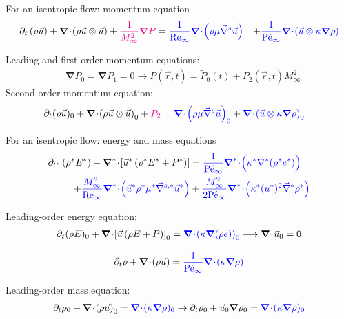 \documentclass[xcolor=dvipsnames,10pt]{beamer}
\renewcommand{\Re}{\textrm{Re}}
\newcommand{\Pe}{\textrm{P\'e}}
\renewcommand{\div}{\boldsymbol{\nabla}\! \cdot \!}
\newcommand{\grad}{\boldsymbol{\nabla}}
\newcommand{\divv}[1]{\boldsymbol{\nabla}^{#1}\! \cdot \!}
\newcommand{\gradd}[1]{\vec{\nabla}^{#1}}
\begin{document}
\begin{frame}{For an isentropic flow: momentum equation}
\begin{align}
\partial_{t} \left( \rho \vec{u} \right) 
+ \div \left( \rho \vec{u}\otimes \vec{u} \right) 
+ \textcolor{magenta}{\frac{1}{M_\infty^2}\grad  P}
&= 
\textcolor{blue}{\frac{1}{\Re_\infty} \div \left( \rho \mu \gradd{s} \vec{u} \right)}
&+
\textcolor{blue}{\frac{1}{\Pe_\infty} \div \left(\vec{u}\otimes \kappa \grad  \rho \right)} \nonumber
\end{align}
\begin{block}{}
Leading and first-order momentum equations:
\begin{align}
&\grad P_0 = \grad P_1 = 0 \longrightarrow P(\vec{r}, t) = \tilde{P}_0(t) + P_2(\vec{r}, t) M_\infty^2\nonumber 
\end{align}
Second-order momentum equation:
\begin{align}
&\partial_t (\rho \vec{u} )_0 + \div \left( \rho \vec{u}\otimes \vec{u} \right)_0 + \textcolor{magenta}{P_2} = \textcolor{blue}{ \div \left( \rho \mu \gradd{s} \vec{u} \right)_0}
+
\textcolor{blue}{ \div \left(\vec{u}\otimes \kappa \grad  \rho \right)_0} \nonumber
\end{align}
\end{block}
\end{frame}
\begin{frame}{For an isentropic flow: energy and mass equations}
\begin{align}
\partial_{t^*} \left( \rho^* E^* \right) 
+ \divv{*}  \left[ \vec{u}^* \left( \rho^* E^* + P^* \right) \right] 
&=
\textcolor{blue}{\frac{1}{\Pe_\infty} \divv{*}  \left( \kappa^*  \gradd{*} (\rho^* e^*) \right)} \nonumber \\
+
\textcolor{blue}{\frac{M_\infty^2}{\Re_\infty} \divv{*}  \left( \vec{u}^* \rho^* \mu^* \gradd{s,*} \vec{u}^* \right)}
&+ 
\textcolor{blue}{\frac{M_\infty^2}{2 \Pe_\infty} \divv{*}  \left(\kappa^* (u^*)^2 \gradd{*} \rho^* \right)} \nonumber
\end{align}
\begin{block}{}
Leading-order energy equation:
\begin{align}
\partial_t ( \rho E )_0 + \div \left[ \vec{u} \left( \rho E + P \right) \right]_0 = \textcolor{blue}{\div \left( \kappa  \grad (\rho e) \right)_0} \longrightarrow \div \vec{u}_0 = 0 \nonumber 
\end{align}
\end{block}
\begin{align}
\partial_{t} \rho+ \div  \left(  \rho \vec{u}  \right) = \textcolor{blue}{\frac{1}{\Pe_\infty} \div  ( \kappa \grad \rho )} \nonumber
\end{align}
\begin{block}{}
Leading-order mass equation:
\begin{align}
\partial_{t} \rho_0+ \div  \left(  \rho \vec{u}  \right)_0 = \textcolor{blue}{ \div ( \kappa \grad \rho )_0} \to \partial_t \rho_0 + \vec{u}_0 \grad \rho_0 = \textcolor{blue}{ \div ( \kappa \grad \rho )_0}\nonumber
\end{align}
\end{block}
\end{frame}
\end{document}
